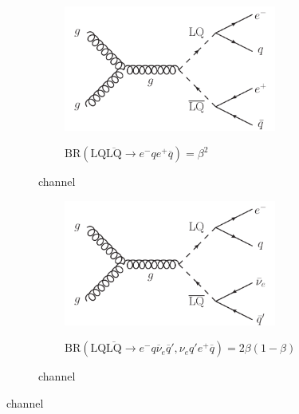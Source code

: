 \begin{figure}
  \centering
  \begin{subfigure}[b]{\textwidth}
    \begin{subfigure}[b]{0.45\textwidth}
      \includegraphics[width=\textwidth]{tex/theory/fig/LQ_pair_decay_eejj}
    \end{subfigure}
    \begin{subfigure}[b]{0.5\textwidth}
      $\text{BR}(\text{LQ}\overline{\text{LQ}} \rightarrow e^{-}qe^{+}\overline{q}) = \beta^2$
    \end{subfigure}
    \caption{\eejj~channel}
    \label{fig:feynman_LO_LQ_pair_eejj}
  \end{subfigure}
  
  \begin{subfigure}[b]{\textwidth}
    \begin{subfigure}[b]{0.45\textwidth}
      \includegraphics[width=\textwidth]{tex/theory/fig/LQ_pair_decay_enujj}
    \end{subfigure}
    \begin{subfigure}[b]{0.5\textwidth}
      $\text{BR}(\text{LQ}\overline{\text{LQ}} \rightarrow e^{-}q\overline{\nu}_{e}\overline{q}', \nu_{e} q' e^{+}\overline{q}  ) = 2\beta (1-\beta)$
    \end{subfigure}
    \caption{\enujj~channel}
    \label{fig:feynman_LO_LQ_pair_enujj}
  \end{subfigure}


\end{figure}
